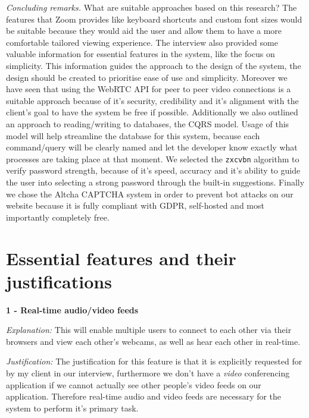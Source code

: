 \textit{Concluding remarks.}
What are suitable approaches based on this research?
The features that Zoom provides like keyboard shortcuts and 
custom font sizes would be suitable because they would aid the
user and allow them to have a more comfortable tailored 
viewing experience. The interview also provided some valuable 
information for essential features in the system, like the 
focus on simplicity. This information guides the approach to 
the design of the system, the design should be created to 
prioritise ease of use and simplicity. Moreover we have seen 
that using the WebRTC API for peer to peer video connections
is a suitable approach because of it's security, credibility
and it's alignment with the client's goal to have the system
be free if possible. Additionally we also outlined an 
approach to reading/writing to databases, the 
CQRS model. Usage of this model will help streamline the 
database for this system, because each command/query will be
clearly named and let the developer know exactly what 
processes are taking place at that moment. We selected
the \texttt{zxcvbn} algorithm to verify password strength, 
because of it's speed, accuracy and it's ability to guide the 
user into selecting a strong password through the built-in 
suggestions. Finally we chose the Altcha CAPTCHA system in 
order to prevent bot attacks on our website because it is 
fully compliant with GDPR, self-hosted and most importantly 
completely free.

\section{Essential features and their justifications}
\label{sec:features}

\textsf{\bfseries 1 - Real-time audio/video feeds} \\ \vspace{0.1cm}

\textit{Explanation:} This will enable multiple users to 
connect to each other via their browsers and view each 
other's webcams, as well as hear
each other in real-time. \vspace{0.1cm}

\textit{Justification:} The justification for this feature is
that it is explicitly requested for by my client in our
interview, furthermore we don't have a \textit{video}
conferencing application if we cannot actually see other 
people's video feeds on our application. Therefore real-time
audio and video feeds are necessary for the system to perform
it's primary task.

